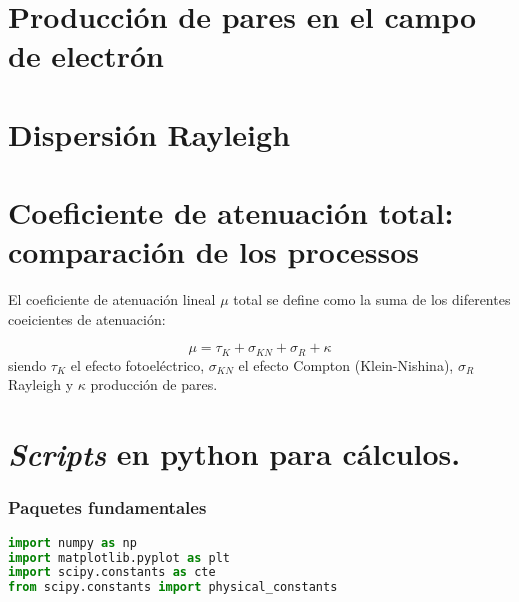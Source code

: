 \section{Producción de pares en el campo de electrón}

\section{Dispersión Rayleigh}

\section{Coeficiente de atenuación total: comparación de los processos}

El coeficiente de atenuación lineal $\mu$ total se define como la suma de los diferentes coeicientes de atenuación: 

\begin{equation}
    \mu = \tau_K + \sigma_{KN} + \sigma_R + \kappa 
\end{equation}
siendo $\tau_K$ el efecto fotoeléctrico, $\sigma_{KN}$ el efecto Compton (Klein-Nishina), $\sigma_R$ Rayleigh y $\kappa$ producción de pares. 


\newpage
\section*{\textit{Scripts} en python para cálculos.}

\subsubsection{Paquetes fundamentales}
\begin{lstlisting}[language=python]
import numpy as np  
import matplotlib.pyplot as plt 
import scipy.constants as cte 
from scipy.constants import physical_constants
\end{lstlisting}

